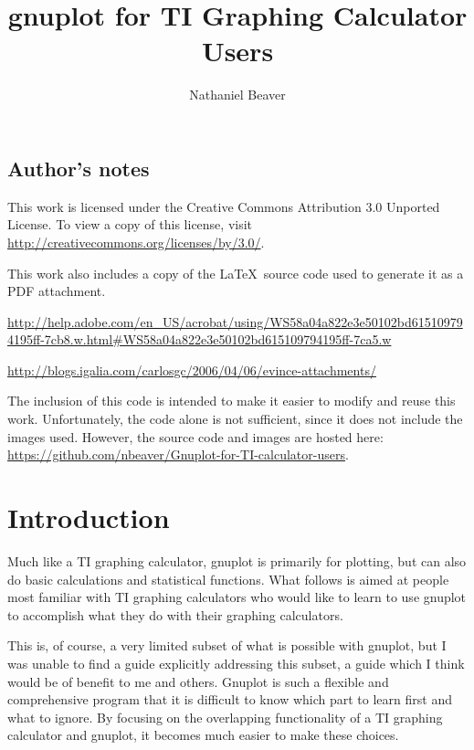 \documentclass[11pt,letterpaper]{report}
\author{Nathaniel Beaver}
\title{gnuplot for TI Graphing Calculator Users}
\begin{document}
\maketitle

\lstset{
language=gnuplot,                       %
basicstyle=\ttfamily,                   %
}



\tableofcontents

\section{Author's notes}

This work is licensed under the Creative Commons Attribution 3.0 Unported License. To view a copy of this license, visit \url{http://creativecommons.org/licenses/by/3.0/}.

This work also includes a copy of the \LaTeX\ source code used to generate it as a PDF attachment.

\url{http://help.adobe.com/en_US/acrobat/using/WS58a04a822e3e50102bd615109794195ff-7cb8.w.html#WS58a04a822e3e50102bd615109794195ff-7ca5.w}

\url{http://blogs.igalia.com/carlosgc/2006/04/06/evince-attachments/}

The inclusion of this code is intended to make it easier to modify and reuse this work. Unfortunately, the code alone is not sufficient, since it does not include the images used. However, the source code and images are hosted here: \url{https://github.com/nbeaver/Gnuplot-for-TI-calculator-users}.

\chapter{Introduction}

Much like a TI graphing calculator, gnuplot is primarily for plotting, but can also do basic calculations and statistical functions. What follows is aimed at people most familiar with TI graphing calculators who would like to learn to use gnuplot to accomplish what they do with their graphing calculators.

This is, of course, a very limited subset of what is possible with gnuplot, but I was unable to find a guide explicitly addressing this subset, a guide which I think would be of benefit to me and others. Gnuplot is such a flexible and comprehensive program that it is difficult to know which part to learn first and what to ignore. By focusing on the overlapping functionality of a TI graphing calculator and gnuplot, it becomes much easier to make these choices.
\end{document}
